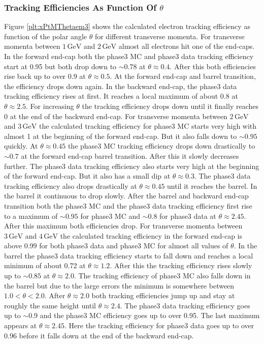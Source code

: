 \documentclass[a4paper,11pt,twosided,final,german,openbib,pdftex,listof=totoc,bibliography=totoc]{scrbook}
\begin{document}
\newpage

\subsubsection{Tracking Efficiencies As Function Of $\theta$}

Figure \ref{plt:xPtMThetaem3} shows the calculated electron tracking efficiency as function of the polar angle $\theta$ for different transverse momenta.
For transverse momenta between $1\,\textrm{GeV}$ and $2\,\textrm{GeV}$ almost all electrons hit one of the end-caps. In the forward end-cap both the phase3 MC and phase3 data tracking efficiency start at 0.95 but both drop down to $\sim 0.78$ at $\theta \approx 0.4$. After this both efficiencies rise back up to over 0.9 at $\theta \approx 0.5$. At the forward end-cap and barrel transition, the efficiency drops down again. In the backward end-cap, the phase3 data tracking efficiency rises at first. It reaches a local maximum of about 0.8 at $\theta \approx 2.5$. For increasing $\theta$ the tracking efficiency drops down until it finally reaches 0 at the end of the backward end-cap.
For transverse momenta between $2\,\textrm{GeV}$ and $3\,\textrm{GeV}$ the calculated tracking efficiency for phase3 MC starts very high with almost 1 at the beginning of the forward end-cap. But it also falls down to $\sim 0.95$ quickly. At $\theta \approx 0.45$ the phase3 MC tracking efficiency drops down drastically to $\sim 0.7$ at the forward end-cap barrel transition. After this it slowly decreases further. The phase3 data tracking efficiency also starts very high at the beginning of the forward end-cap. But it also has a small dip at $\theta \approx 0.3$. The phase3 data tracking efficiency also drops drastically at $\theta \approx 0.45$ until it reaches the barrel. In the barrel it continuous to drop slowly. After the barrel and backward end-cap transition both the phase3 MC and the phase3 data tracking efficiency first rise to a maximum of $\sim 0.95$ for phase3 MC and $\sim 0.8$ for phase3 data at $\theta \approx 2.45$. After this maximum both efficiencies drop.
For transverse momenta between $3\,\textrm{GeV}$ and $4\,\textrm{GeV}$ the calculated tracking efficiency in the forward end-cap is above 0.99 for both phase3 data and phase3 MC for almost all values of $\theta$. In the barrel the phase3 data tracking efficiency starts to fall down and reaches a local minimum of about 0.72 at $\theta \approx 1.2$. After this the tracking efficiency rises slowly up to $\sim 0.85$ at $\theta \approx 2.0$. The tracking efficiency of phase3 MC also falls down in the barrel but due to the large errors the minimum is somewhere between $1.0 < \theta < 2.0$. After $\theta \approx 2.0$ both tracking efficiencies jump up and stay at roughly the same height until $\theta \approx 2.4$. The phase3 data tracking efficiency goes up to $\sim 0.9$ and the phase3 MC efficiency goes up to over 0.95. The last maximum appears at $\theta \approx 2.45$. Here the tracking efficiency for phase3 data goes up to over 0.96 before it  falls down at the end of the backward end-cap.
\end{document}
